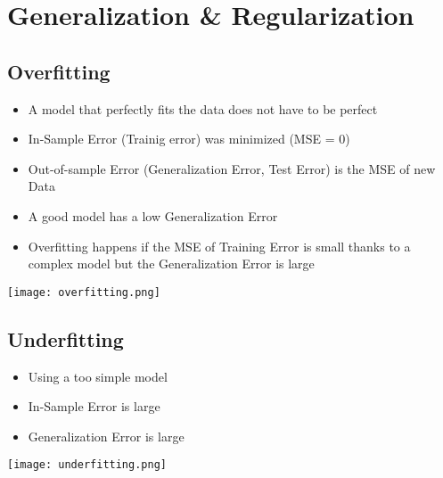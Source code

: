 \section{Generalization \& Regularization}
\subsection{Overfitting}
\begin{itemize}
    \item A model that perfectly fits the data does not have to be perfect
    \item In-Sample Error (Trainig error) was minimized (MSE = 0)
    \item Out-of-sample Error (Generalization Error, Test Error) is the MSE of new Data
    \item A good model has a low Generalization Error
    \item Overfitting happens if the MSE of Training Error is small thanks to a complex model but the Generalization Error is large
\end{itemize}
\texttt{[image: overfitting.png]}

\subsection{Underfitting}
\begin{itemize}
    \item Using a too simple model
    \item In-Sample Error is large
    \item Generalization Error is large
\end{itemize}

\texttt{[image: underfitting.png]}

